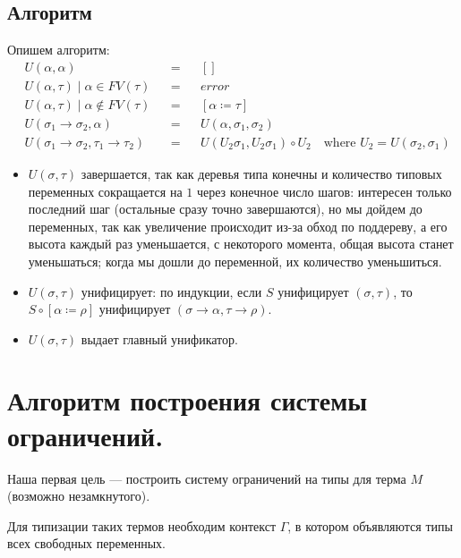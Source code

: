 \documentclass[11pt,a4paper]{article}
\begin{document}
\subsection{Алгоритм }
Опишем алгоритм:
\[
\begin{aligned}
	& U( \alpha , \alpha ) &&=&& [] \\
	& U( \alpha , \tau ) \mid \alpha \in FV( \tau ) &&=&& error \\
	& U( \alpha , \tau ) \mid \alpha \notin FV( \tau ) &&=&& [ \alpha \coloneqq \tau ] \\
	& U( \sigma _1 \to \sigma _2, \alpha ) && = && U( \alpha , \sigma _1, \sigma _2) \\
	& U( \sigma _1 \to \sigma _2, \tau _1 \to \tau _2) &&=&& U(U_2 \sigma _1, U_2 \sigma _1) \circ U_2 \quad \text{where } U_2 = U( \sigma _2, \sigma _1)
\end{aligned}
\]
\begin{itemize}
	\item $ U( \sigma , \tau )$ завершается, так как деревья типа конечны и количество типовых переменных сокращается на $ 1$ через конечное число шагов: интересен только последний шаг (остальные сразу точно завершаются), но мы дойдем до переменных, так как увеличение происходит из-за обход по поддереву, а его высота каждый раз уменьшается, с некоторого момента, общая высота станет уменьшаться; когда мы дошли до переменной, их количество уменьшиться.
	\item $ U( \sigma, \tau )$ унифицирует: по индукции, если $ S$ унифицирует $ ( \sigma, \tau )$, то $ S \circ [ \alpha \coloneqq \rho]$ унифицирует $ ( \sigma \to \alpha , \tau \to \rho)$.
	\item $ U ( \sigma , \tau )$ выдает главный унификатор.
\end{itemize}


\section{Алгоритм построения системы ограничений.}
Наша первая цель --- построить систему ограничений на типы для терма $M$ (возможно незамкнутого).

Для типизации таких термов необходим контекст $ \Gamma $, в котором объявляются типы всех свободных переменных.
\end{document}
